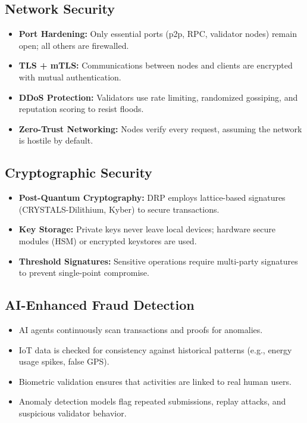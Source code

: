 \documentclass[11pt,a4paper]{article}
\begin{document}
\subsection{Network Security}
\begin{itemize}
    \item \textbf{Port Hardening:} Only essential ports (p2p, RPC, validator nodes) remain open; all others are firewalled.  
    \item \textbf{TLS + mTLS:} Communications between nodes and clients are encrypted with mutual authentication.  
    \item \textbf{DDoS Protection:} Validators use rate limiting, randomized gossiping, and reputation scoring to resist floods.  
    \item \textbf{Zero-Trust Networking:} Nodes verify every request, assuming the network is hostile by default.  
\end{itemize}

\subsection{Cryptographic Security}
\begin{itemize}
    \item \textbf{Post-Quantum Cryptography:} DRP employs lattice-based signatures (CRYSTALS-Dilithium, Kyber) to secure transactions.  
    \item \textbf{Key Storage:} Private keys never leave local devices; hardware secure modules (HSM) or encrypted keystores are used.  
    \item \textbf{Threshold Signatures:} Sensitive operations require multi-party signatures to prevent single-point compromise.  
\end{itemize}

\subsection{AI-Enhanced Fraud Detection}
\begin{itemize}
    \item AI agents continuously scan transactions and proofs for anomalies.  
    \item IoT data is checked for consistency against historical patterns (e.g., energy usage spikes, false GPS).  
    \item Biometric validation ensures that activities are linked to real human users.  
    \item Anomaly detection models flag repeated submissions, replay attacks, and suspicious validator behavior.  
\end{itemize}
\end{document}

